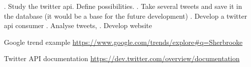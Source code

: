 \documentclass[]{class}
\begin{document}


 . Study the twitter api. Define possibilities.
 . Take several tweets and save it in the database (it would be a base for the future development)
 . Develop a twitter api consumer
 . Analyse tweets,
 . Develop website


\newpage

\begin{thebibliography}{1}

   Google trend example \url{https://www.google.com/trends/explore#q=Sherbrooke}

   Twitter API documentation \url{https://dev.twitter.com/overview/documentation}

\end{thebibliography}
\end{document}
